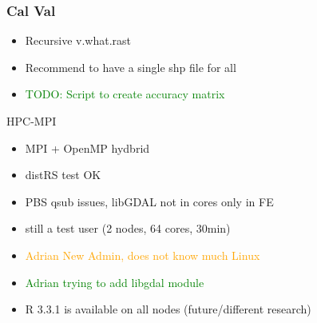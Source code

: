 \documentclass[serif,mathserif,aspectratio=169]{beamer}
\begin{document}
{
\begin{frame}[plain]
\end{frame}}


\begin{frame}
  \frametitle{Cal Val}
\begin{center}
\begin{itemize}
 \item Recursive v.what.rast
 \item Recommend to have a single shp file for all
 \item \textcolor{green}{TODO: Script to create accuracy matrix}
\end{itemize}
\end{center}
\end{frame}


{
\begin{frame}[plain]
\begin{shaded}
\Huge HPC-MPI
\end{shaded}
\end{frame}}


\begin{frame}
\begin{center}
\begin{itemize}
 \item MPI + OpenMP hydbrid
 \item distRS test OK
 \item PBS qsub issues, libGDAL not in cores only in FE 
 \item still a test user (2 nodes, 64 cores, 30min)
 \item \textcolor{orange}{Adrian New Admin, does not know much Linux}
 \item \textcolor{green}{Adrian trying to add libgdal module}
 \item R 3.3.1 is available on all nodes (future/different research)
\end{itemize}
\end{center}
\end{frame}
\end{document}
